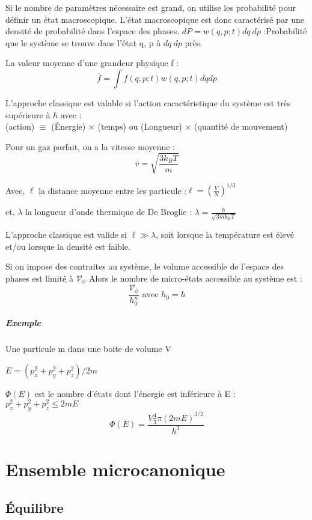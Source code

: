\documentclass[12pt,a4paper]{report}
\begin{document}
Si le nombre de paramètres nécessaire est grand, on utilise les probabilité pour définir un état macroscopique.
L'état macroscopique est donc caractérisé par une densité de probabilité dans l'espace des phases.
\(dP = w\left( q, p; t\right) dq~dp\) :Probabilité que le système se trouve dans l'état {q, p} à \(dq~dp\) près.

La valeur moyenne d'une grandeur physique f :
\[
	\overline{f} = \int f(q,p; t) w(q,p;t)dq dp
\]

L'approche classique est valable si l'action caractéristique du système est très supérieure à \(\hbar\) avec :\\
(action) \(\equiv\) (Énergie) \(\times\) (temps) ou (Longueur) \(\times\) (quantité de mouvement)

Pour un gaz parfait, on a la vitesse moyenne :
\[
	\overline{v} = \sqrt{\dfrac{3 k_B T}{m}}
\]

Avec, \(\ell\) la distance moyenne entre les particule :\(\ell = \left( \frac{V}{N}\right)^{1/3}\)

et, \(\lambda\) la longueur d'onde thermique de De Broglie : \(\lambda = \frac{\hbar}{\sqrt{3mk_BT}}\)

L'approche classique est valide si \(\ell \gg \lambda\), soit lorsque la température est élevé et/ou lorsque la densité est faible.

Si on impose des contraites au système, le volume accessible de l'espace des phases est limité à \(\mathscr{V}_\phi\)
Alors le nombre de micro-états accessible au système est :
\[
	\dfrac{\mathscr{V}_\phi}{h_0^n} \text{ avec } h_0 = h
\]

\paragraph{Exemple} Une particule m dans une boite de volume V


\(E = \left( p_x^2 + p_y^2 + p_z^2\right)/2m\)

\(\Phi(E)\) est le nombre d'états dont l'énergie est inférieure à E :\\
\(p_x^2 + p_y^2 + p_z^2 \leq 2mE\)
\[
	\Phi(E) = \dfrac{V \frac{4}{3} \pi (2mE)^{3/2}}{h^3}
\]

\chapter{Ensemble microcanonique}

\section{Équilibre}
\end{document}
